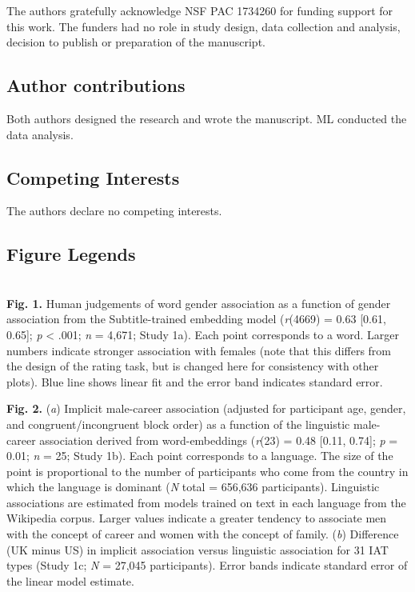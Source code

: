\documentclass[11pt]{wlscirep}
\begin{document}
The authors gratefully acknowledge NSF PAC 1734260 for funding support for this work. The funders had no role in study design, data collection and analysis, decision to publish or preparation of the manuscript.

\subsection*{Author contributions}

Both authors designed the research and wrote the manuscript. ML conducted the data analysis.

\subsection*{Competing Interests}
The authors declare no competing interests.

\subsection*{Figure Legends} ~\\


{\bf Fig. 1.} Human judgements of word gender association as
a function of gender association from the Subtitle-trained embedding model
(\emph{r}(4669) = 0.63 {[}0.61, 0.65{]}; \emph{p} \textless{} .001; {\emph n} = 4,671; Study 1a). Each point corresponds to a word. Larger numbers indicate
stronger association with females (note that this differs from the
design of the rating task, but is changed here for consistency with
other plots). Blue line shows linear fit and the error band indicates
standard error.


 {\bf Fig. 2.} ({\it a})  Implicit male-career association (adjusted for participant age, gender, and congruent/incongruent block order) as a function of the linguistic male-career association derived from word-embeddings (\emph{r}(23) = 0.48 {[}0.11, 0.74{]}; \emph{p} = 0.01; \emph{n} = 25; Study 1b). Each point corresponds to a language. The size of the point is proportional to the number of participants who come from the country in which the language is dominant ({\it N} total = 656,636 participants). Linguistic associations are estimated from models trained on text in each language from the Wikipedia corpus. Larger values indicate a greater tendency to associate men with the concept of career and women with the concept of family. ({\it b}) Difference (UK minus US) in implicit association versus linguistic association for 31 IAT types (Study 1c; {\it N} = 27,045 participants). Error bands indicate standard error of the linear model
estimate.
\end{document}
